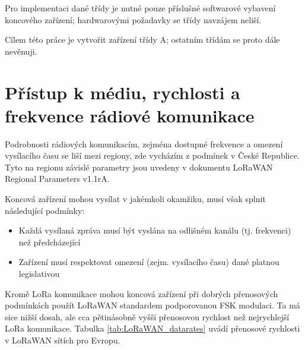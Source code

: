     Pro implementaci dané třídy je nutné pouze příslušné softwarové vybavení
    koncového zařízení; hardwarovými požadavky se třídy navzájem neliší.

    Cílem této práce je vytvořit zařízení třídy A; ostatním třídám se proto
    dále nevěnuji.

\section{Přístup k médiu, rychlosti a frekvence rádiové komunikace}

    Podrobnosti rádiových komunikacím, zejména dostupné frekvence a omezení 
    vysílacího času se liší mezi regiony, zde vycházím z podmínek v České 
    Republice. Tyto na regionu závislé parametry jsou uvedeny v dokumentu 
    LoRaWAN Regional Parameters v1.1rA.

    Koncová zařízení mohou vysílat v jakémkoli okamžiku, musí však
    splnit následující podmínky:

    \begin{itemize}
        \item Každá vysílaná zpráva musí být vyslána na odlišném kanálu 
            (tj. frekvenci) než předcházející
        \item Zařízení musí respektovat omezení (zejm. vysílacího času) dané 
            platnou legislativou
    \end{itemize}    
 
    Kromě LoRa komunikace mohou koncová zařízení při dobrých přenosových
    podmínkách použít LoRaWAN standardem podporovanou FSK modulaci. Ta má sice
    nižší dosah, ale cca 
    pětinásobně vyšší přenosovou rychlost než nejrychlejší LoRa komunikace. 
    Tabulka \ref{tab:LoRaWAN_datarates} uvádí přenosové rychlosti v LoRaWAN 
    sítích pro Evropu.

